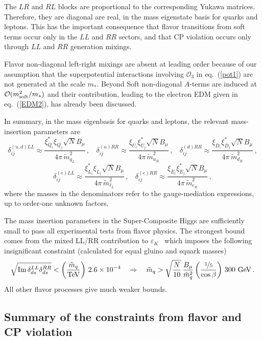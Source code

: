 \documentclass[a4paper,12pt]{article}
\newcommand{\beq}{\begin{equation}}
\newcommand{\eeq}{\end{equation}}
\def\eq#1{eq.~(\ref{#1})}
\def\eq#1{eq.~(\ref{#1})}
\def\O{\mathcal{O}}
\def\mst{m_*}
\def\msoft{m_{\rm soft}}
\begin{document}
{{{{The $LR$ and $RL$ blocks are proportional to the corresponding Yukawa matrices. Therefore, they are diagonal are real, in the mass eigenstate basis for quarks and leptons. This has the important consequence that flavor transitions from soft terms occur only in the $LL$ and $RR$ sectors, and that CP violation occurs only through $LL$ and $RR$ generation mixings. 

Flavor non-diagonal left-right mixings are absent at leading order because of our assumption that the superpotential interactions involving $\O_3$ in \eq{pot1} are not generated at the scale $\mst$. Beyond Soft non-diagonal $A$-terms are induced at $\O(\msoft^2 /\mst)$ and their contribution, leading to the electron EDM given in \eq{EDM2}, has already been discussed.

In summary, in the mass eigenbasis for quarks and leptons, the relevant mass-insertion parameters are 
\beq
\delta^{(u,d)LL}_{ij}\approx \frac{\xi_{Q_i}^* \xi_{Q_j} \sqrt{N} B_\mu}{4\pi \, {\tilde m}_{q_L}^2} \, , ~~~~
\delta^{(u)RR}_{ij}\approx \frac{\xi_{{\bar U}_i} \xi_{{\bar U}_j}^* \sqrt{N} B_\mu}{4\pi \, {\tilde m}_{u_R}^2} \, , ~~~~
\delta^{(d)RR}_{ij}\approx \frac{\xi_{{\bar D}_i} \xi_{{\bar D}_j}^* \sqrt{N} B_\mu}{4\pi \, {\tilde m}_{d_R}^2} \, , 
\eeq
\beq
\delta^{(e )LL}_{ij}\approx \frac{\xi_{L_i}^* \xi_{L_j} \sqrt{N} B_\mu}{4\pi \, {\tilde m}_{\ell_L}^2} \, , ~~~~
\delta^{(e)RR}_{ij}\approx \frac{\xi_{{\bar E}_i} \xi_{{\bar E}_j}^* \sqrt{N} B_\mu}{4\pi \, {\tilde m}_{e_R}^2} \, , 
\eeq
where the masses in the denominators refer to the gauge-mediation expressions, up to order-one unknown factors.

The mass insertion parameters in the Super-Composite Higgs are sufficiently small to pass all experimental tests from flavor physics. The strongest bound comes from the mixed LL/RR contribution to $\varepsilon_K$~\cite{Ciuchini:1998ix} which imposes the following insignificant constraint (calculated for equal gluino and squark masses)
\beq
\sqrt{ \text{Im}\, \delta^{LL}_{ds} \delta^{RR}_{ds}}< \left( \frac{{\tilde m}_{q}}{\text{TeV}}\right)  \, 2.6 \times 10^{-4} ~~~\Rightarrow ~~~
{\tilde m}_{q} >  
\sqrt{\frac{N}{10}}  
\, \frac{B_\mu}{{\tilde m}_{q}^2 }
\left( \frac{\nicefrac{1}{5}}{\cos \beta} \right)  \, 300~ \text{GeV} \, .
\label{limfs}
\eeq
All other flavor processes give much weaker bounds.

\boldmath
\subsection{Summary of the constraints from flavor and CP violation}
\unboldmath
\label{flavorsummary}

}}}}
\end{document}
